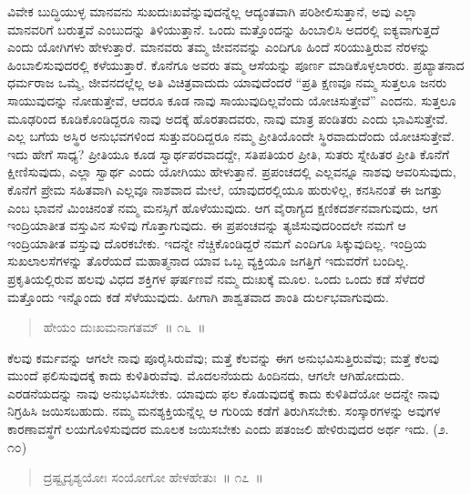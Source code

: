 ವಿವೇಕ ಬುದ್ಧಿಯುಳ್ಳ ಮಾನವನು ಸುಖದುಃಖವೆನ್ನುವುದನ್ನೆಲ್ಲ ಆದ್ಯಂತವಾಗಿ ಪರಿಶೀಲಿಸುತ್ತಾನೆ, ಅವು ಎಲ್ಲಾ ಮಾನವರಿಗೆ ಬರುತ್ತವೆ ಎಂಬುದನ್ನು ತಿಳಿಯುತ್ತಾನೆ. ಒಂದು ಮತ್ತೊಂದನ್ನು ಹಿಂಬಾಲಿಸಿ ಅದರಲ್ಲಿ ಐಕ್ಯವಾಗುತ್ತದೆ ಎಂದು ಯೋಗಿಗಳು ಹೇಳುತ್ತಾರೆ. ಮಾನವರು ತಮ್ಮ ಜೀವನವನ್ನು ಎಂದಿಗೂ ಹಿಂದೆ ಸರಿಯುತ್ತಿರುವ ನೆರಳನ್ನು ಹಿಂಬಾಲಿಸುವುದರಲ್ಲಿ ಕಳೆಯುತ್ತಾರೆ. ಕೊನೆಗೂ ಅವರು ತಮ್ಮ ಆಸೆಯನ್ನು ಪೂರ್ಣ ಮಾಡಿಕೊಳ್ಳಲಾರರು. ಪ್ರಖ್ಯಾತನಾದ ಧರ್ಮರಾಜ ಒಮ್ಮೆ, ಜೀವನದಲ್ಲೆಲ್ಲ ಅತಿ ವಿಚಿತ್ರವಾದುದು ಯಾವುದೆಂದರೆ “ಪ್ರತಿ ಕ್ಷಣವೂ ನಮ್ಮ ಸುತ್ತಲೂ ಜನರು ಸಾಯುವುದನ್ನು ನೋಡುತ್ತೇವೆ, ಆದರೂ ಕೂಡ ನಾವು ಸಾಯುವುದಿಲ್ಲವೆಂದು ಯೋಚಿಸುತ್ತೇವೆ” ಎಂದನು. ಸುತ್ತಲೂ ಮೂಢರಿಂದ ಕೂಡಿಕೊಂಡಿದ್ದರೂ ನಾವು ಅದಕ್ಕೆ ಹೊರತಾದವರು, ನಾವು ಮಾತ್ರ ಪಂಡಿತರು ಎಂದು ಭಾವಿಸುತ್ತೇವೆ. ಎಲ್ಲ ಬಗೆಯ ಅಸ್ಥಿರ ಅನುಭವಗಳಿಂದ ಸುತ್ತುವರಿದಿದ್ದರೂ ನಮ್ಮ ಪ್ರೀತಿಯೊಂದೇ ಸ್ಥಿರವಾದುದೆಂದು ಯೋಚಿಸುತ್ತೇವೆ. ಇದು ಹೇಗೆ ಸಾಧ್ಯ? ಪ್ರೀತಿಯೂ ಕೂಡ ಸ್ವಾರ್ಥಪರವಾದದ್ದೇ, ಸತಿಪತಿಯರ ಪ್ರೀತಿ, ಸುತರು ಸ್ನೇಹಿತರ ಪ್ರೀತಿ ಕೊನೆಗೆ ಕ್ಷೀಣಿಸುವುದು, ಎಲ್ಲಾ ಸ್ವಾರ್ಥ ಎಂದು ಯೋಗಿಯು ಹೇಳುತ್ತಾನೆ. ಪ್ರಪಂಚದಲ್ಲಿ ಎಲ್ಲವನ್ನೂ ನಾಶವು ಆವರಿಸುವುದು, ಕೊನೆಗೆ ಪ್ರೇಮ ಸಹಿತವಾಗಿ ಎಲ್ಲವೂ ನಾಶವಾದ ಮೇಲೆ, ಯಾವುದರಲ್ಲಿಯೂ ಹುರುಳಿಲ್ಲ, ಕನಸಿನಂತೆ ಈ ಜಗತ್ತು ಎಂಬ ಭಾವನೆ ಮಿಂಚಿನಂತೆ ನಮ್ಮ ಮನಸ್ಸಿಗೆ ಹೊಳೆಯುವುದು. ಆಗ ವೈರಾಗ್ಯದ ಕ್ಷಣಿಕದರ್ಶನವಾಗುವುದು, ಆಗ ಇಂದ್ರಿಯಾತೀತ ವಸ್ತುವಿನ ಸುಳಿವು ಗೊತ್ತಾಗುವುದು. ಈ ಪ್ರಪಂಚವನ್ನು ತ್ಯಜಿಸುವುದರಿಂದಲೇ ನಮಗೆ ಆ ಇಂದ್ರಿಯಾತೀತ ವಸ್ತುವು ದೊರಕಬೇಕು. ಇದನ್ನೇ ನೆಚ್ಚಿಕೊಂಡಿದ್ದರೆ ನಮಗೆ ಎಂದಿಗೂ ಸಿಕ್ಕುವುದಿಲ್ಲ. ಇಂದ್ರಿಯ ಸುಖಲಾಲಸೆಗಳನ್ನು ತೊರೆಯದೆ ಮಹಾತ್ಮನಾದ ಯಾವ ಒಬ್ಬ ವ್ಯಕ್ತಿಯೂ ಜಗತ್ತಿಗೆ ಇದುವರೆಗೆ ಬಂದಿಲ್ಲ. ಪ್ರಕೃತಿಯಲ್ಲಿರುವ ಹಲವು ವಿಧದ ಶಕ್ತಿಗಳ ಘರ್ಷಣವೆ ನಮ್ಮ ದುಃಖಕ್ಕೆ ಮೂಲ. ಒಂದು ಒಂದು ಕಡೆ ಸೆಳೆದರೆ ಮತ್ತೊಂದು ಇನ್ನೊಂದು ಕಡೆ ಸೆಳೆಯುವುದು. ಹೀಗಾಗಿ ಶಾಶ್ವತವಾದ ಶಾಂತಿ ದುರ್ಲಭ\break ವಾಗುವುದು. 

\vspace{-0.3cm}

\begin{verse}
ಹೇಯಂ ದುಃಖಮನಾಗತಮ್​~॥ ೧೬~॥
\end{verse}

\vspace{-0.3cm}


ಕೆಲವು ಕರ್ಮವನ್ನು ಆಗಲೇ ನಾವು ಪೂರೈಸಿರುವೆವು; ಮತ್ತೆ ಕೆಲವನ್ನು ಈಗ ಅನುಭವಿಸುತ್ತಿರುವೆವು; ಮತ್ತೆ ಕೆಲವು ಮುಂದೆ ಫಲಿಸುವುದಕ್ಕೆ ಕಾದು ಕುಳಿತಿರುವೆವು. ಮೊದಲನೆಯದು ಹಿಂದಿನದು, ಆಗಲೇ ಆಗಿಹೋದುದು. ಎರಡನೆಯದನ್ನು ನಾವು ಅನುಭವಿಸಬೇಕು. ಯಾವುದು ಫಲ ಕೊಡುವುದಕ್ಕೆ ಕಾದು ಕುಳಿತಿದೆಯೋ ಅದನ್ನೇ ನಾವು ನಿಗ್ರಹಿಸಿ ಜಯಿಸಬಹುದು. ನಮ್ಮ ಮನಶ್ಯಕ್ತಿಯನ್ನೆಲ್ಲ ಆ ಗುರಿಯ ಕಡೆಗೆ ತಿರುಗಿಸಬೇಕು. ಸಂಸ್ಕಾರಗಳನ್ನು ಅವುಗಳ ಕಾರಣಾವಸ್ಥೆಗೆ ಲಯಗೊಳಿಸುವುದರ ಮೂಲಕ ಜಯಿಸಬೇಕು ಎಂದು ಪತಂಜಲಿ ಹೇಳಿರುವುದರ ಅರ್ಥ ಇದು. (೨. ೧೦)


\begin{verse}
ದ್ರಷ್ಟೃದೃಶ್ಯಯೋಃ ಸಂಯೋಗೋ ಹೇಳಹೇತುಃ~॥ ೧೭~॥
\end{verse}

